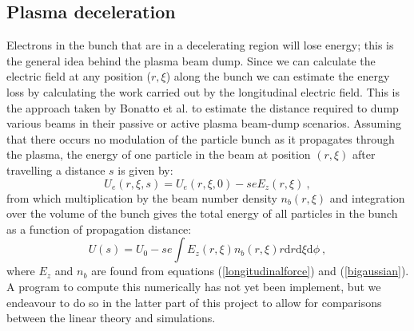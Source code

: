 \subsection{Plasma deceleration}
Electrons in the bunch that are in a decelerating region will lose energy; this is the general idea behind the plasma beam dump. Since we can calculate the electric field at any position ($r,\xi$) along the bunch we can estimate the energy loss by calculating the work carried out by the longitudinal electric field. This is the approach taken by Bonatto et al. \cite{Bonatto2015} to estimate the distance required to dump various beams in their passive or active plasma beam-dump scenarios. Assuming that there occurs no modulation of the particle bunch as it propagates through the plasma, the energy of one particle in the beam at position $(r,\xi)$ after travelling a distance $s$ is given by:
\begin{equation}
U_e(r,\xi,s)=U_e(r,\xi,0)-seE_z(r,\xi)~,
\end{equation}
from which multiplication by the beam number density $n_b(r,\xi)$ and integration over the volume of the bunch gives the total energy of all particles in the bunch as a function of propagation distance:
\begin{equation}
U(s)=U_0-se\int E_z(r,\xi)n_b(r,\xi)r\mathrm{d}r\mathrm{d}\xi\mathrm{d}\phi~,
\label{energy_loss_bonatto}
\end{equation}
where $E_z$ and $n_b$ are found from equations (\ref{longitudinalforce}) and (\ref{bigaussian}). A program to compute this numerically has not yet been implement, but we endeavour to do so in the latter part of this project to allow for comparisons between the linear theory and simulations.
